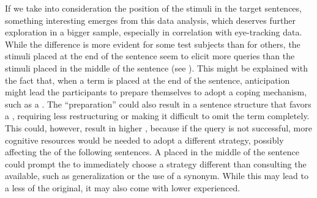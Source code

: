 \documentclass[output=paper]{langsci/langscibook}
\begin{document}
If we take into consideration the position of the stimuli in the target sentences, something interesting emerges from this data analysis, which deserves further exploration in a bigger sample, especially in correlation with eye-tracking data. While the difference is more evident for some test subjects than for others, the stimuli placed at the end of the sentence seem to elicit more queries than the stimuli placed in the middle of the sentence (see ). This might be explained with the fact that, when a term is placed at the end of the sentence, anticipation might lead the participants to prepare themselves to adopt a coping mechanism, such as a . The ``preparation'' could also result in a sentence structure that favors a , requiring less restructuring or making it difficult to omit the term completely. This could, however, result in higher , because if the query is not successful, more cognitive resources would be needed to adopt a different strategy, possibly affecting the  of the following sentences. A  placed in the middle of the sentence could prompt the  to immediately choose a strategy different than consulting the  available, such as generalization or the use of a synonym. While this may lead to a less  of the original, it may also come with lower  experienced.
\end{document}
